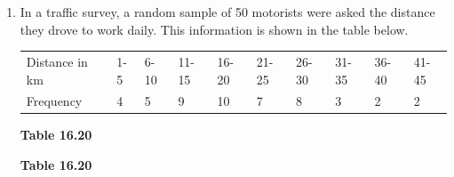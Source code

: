 \begin{description}[noitemsep]
\begin{description}[noitemsep]
\begin{enumerate}[noitemsep, label=\textbf{\arabic*}. ]
  \label{m39404*id217711}\begin{enumerate}[noitemsep, label=\textbf{\alph*}. ] 
            \label{m39404*uid137}\item Set up a frequency table using 6 intervals.
\label{m39404*uid138}\item Calculate the approximate mean.
\label{m39404*uid139}\item Determine the mode.
\label{m39404*uid140}\item How many learners are taller than your approximate average in (b)?
\end{enumerate}
                \label{m39404*uid141}\item In a traffic survey, a random sample of 50 motorists were asked the distance they drove to work daily. This information is shown in the table below.
          \begin{table}[H]
        \begin{center}
      \label{m39404*id217778}
    \noindent
      \tablelasttail{}
      \begin{xtabular}[t]{|l|l|l|l|l|l|l|l|l|l|}\hline
        Distance in km &
        1-5 &
        6-10 &
        11-15 &
        16-20 &
        21-25 &
        26-30 &
        31-35 &
        36-40 &
        41-45%
     \tabularnewline{}
        Frequency &
        4 &
        5 &
        9 &
        10 &
        7 &
        8 &
        3 &
        2 &
        2%
     \tabularnewline{}
    \end{xtabular}
      \end{center}
    \begin{center}{\small\bfseries Table 16.20}\end{center}
    \begin{caption}{\small\bfseries Table 16.20}\end{caption}

\end{table}
\end{enumerate}
\end{description}
\end{description}
